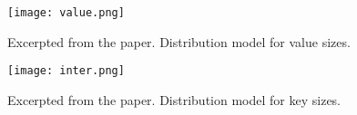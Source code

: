 \documentclass[11pt]{article}
\begin{document}
\begin{figure}
\begin{center}
\texttt{[image: value.png]}
\caption{Excerpted from the paper. Distribution model for value sizes.}
\end{center}
\end{figure}

\begin{figure}
\begin{center}
\texttt{[image: inter.png]}
\caption{Excerpted from the paper. Distribution model for key sizes.}
\end{center}
\end{figure}
\end{document}
